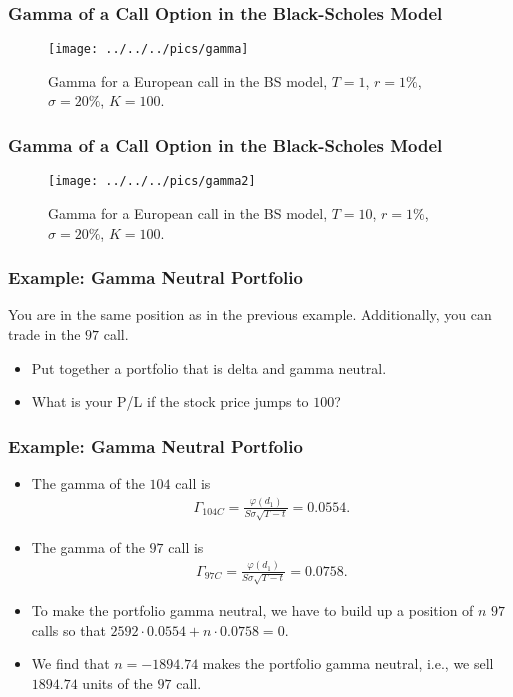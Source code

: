 \begin{frame}[fragile]
\frametitle{Gamma of a Call Option in the Black-Scholes Model}
\begin{figure}[htp]
\begin{center}
  \texttt{[image: ../../../pics/gamma]}
  \caption{Gamma for a European call in the BS model, $T=1$, $r=1\%$,
  $\sigma=20\%$, $K=100$.}
  \label{fig:gammaBS}
\end{center}
\end{figure}
\end{frame}

\begin{frame}[fragile]
\frametitle{Gamma of a Call Option in the Black-Scholes Model}
\begin{figure}[htp]
\begin{center}
  \texttt{[image: ../../../pics/gamma2]}
  \caption{Gamma for a European call in the BS model, $T=10$, $r=1\%$,
  $\sigma=20\%$, $K=100$.}
  \label{fig:gamma2BS}
\end{center}
\end{figure}
\end{frame}

\begin{frame}[fragile]
\frametitle{Example: Gamma Neutral Portfolio}
You are in the same position as in the previous example. Additionally, you can
trade in the $97$ call. 
\begin{itemize}
  \item Put together a portfolio that is delta and gamma neutral.
  \item What is your P/L if the stock price jumps to $100$?
\end{itemize}
\end{frame}

\begin{frame}[fragile]
\frametitle{Example: Gamma Neutral Portfolio}
\begin{itemize}
  \item The gamma of the $104$ call is 
  \begin{align*}
  \Gamma_{104C} = \frac{\varphi(d_1)}{S\sigma \sqrt{T-t}} = 0.0554.
  \end{align*}
  \item The gamma of the $97$ call is 
  \begin{align*}
  \Gamma_{97C} = \frac{\varphi(d_1)}{S\sigma \sqrt{T-t}} = 0.0758.
  \end{align*}
  \item To make the portfolio gamma neutral, we have to build up a position of
  $n$ $97$ calls so that $2592\cdot 0.0554 +n\cdot 0.0758 = 0$.
  \item We find that $n=-1894.74$ makes the portfolio gamma neutral, i.e., we
  sell $1894.74$ units of the $97$ call.
\end{itemize}
\end{frame}

